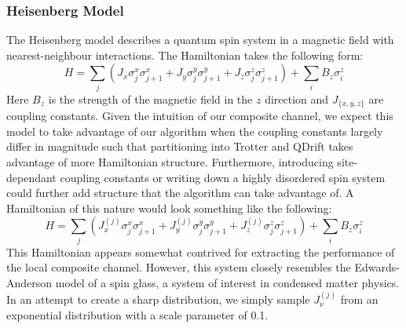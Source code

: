 \subsubsection{Heisenberg Model}
The Heisenberg model describes a quantum spin system in a magnetic field with nearest-neighbour interactions. The Hamiltonian takes the following form:
\begin{equation} \label{eq:heisenberg}
    H = \sum_j \left(J_x \sigma_j^x \sigma_{j+1}^x + J_y \sigma_j^y \sigma_{j+1}^y + J_z \sigma_j^z \sigma_{j+1}^z \right)+ \sum_i B_z \sigma_i^z
\end{equation}
Here $B_z$ is the strength of the magnetic field in the $z$ direction and $J_{\{x, y, z\}}$ are coupling constants. Given the intuition of our composite channel, we expect this model to take advantage of our algorithm when the coupling constants largely differ in magnitude such that partitioning into Trotter and QDrift takes advantage of more Hamiltonian structure. Furthermore, introducing site-dependant coupling constants or writing down a highly disordered spin system could further add structure that the algorithm can take advantage of. A Hamiltonian of this nature would look something like the following: 
\begin{equation} \label{eq:spin_glass}
    H = \sum_j \left(J_x^{(j)} \sigma_j^x \sigma_{j+1}^x + J_y^{(j)} \sigma_j^y \sigma_{j+1}^y + J_z^{(j)} \sigma_j^z \sigma_{j+1}^z \right) + \sum_i B_z \sigma_i^z
\end{equation}
This Hamiltonian appears somewhat contrived for extracting the performance of the local composite channel. However, this system closely resembles the Edwards-Anderson model of a spin glass, a system of interest in condensed matter physics. In an attempt to create a sharp distribution, we simply sample $J_\nu^{(j)}$ from an exponential distribution with a scale parameter of 0.1. \\

